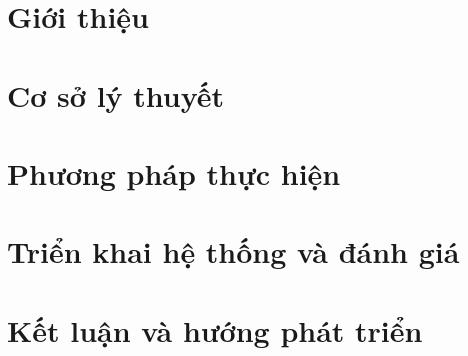 \documentclass{template/thesis}
\begin{document}
\firstbeforepreface
\secondbeforepreface
\setcounter{page}{1}
\newpage
\afterpreface

\chapter{Giới thiệu}
\label{c:intro}


\chapter{Cơ sở lý thuyết}
\label{c:cosolythuyet}



\chapter{Phương pháp thực hiện}
\label{c:phuongphapthuchien}


\chapter{Triển khai hệ thống và đánh giá}
\label{c:thucnghiemdanhgia}



\chapter{Kết luận và hướng phát triển}
\label{c:ketluanvaphattrien}



\appendix
\renewcommand{\cftchappresnum}{Phụ lục }
\addtocontents{toc}{\protect\renewcommand{\protect\cftchappresnum}{Phụ lục }}


\begingroup
\setlength{\emergencystretch}{8em}
\justifying\printbibliography[title=Tài liệu tham khảo]
\endgroup
{}
\end{document}
